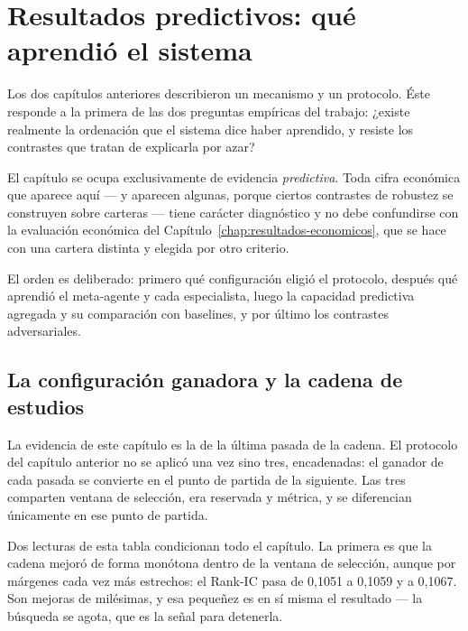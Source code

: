 \chapter{Resultados predictivos: qué aprendió el sistema}
\label{chap:resultados}

Los dos capítulos anteriores describieron un mecanismo y un protocolo. Éste responde a la primera de
las dos preguntas empíricas del trabajo: ¿existe realmente la ordenación que el sistema dice haber
aprendido, y resiste los contrastes que tratan de explicarla por azar?

El capítulo se ocupa exclusivamente de evidencia \emph{predictiva}. Toda cifra económica que aparece
aquí --- y aparecen algunas, porque ciertos contrastes de robustez se construyen sobre carteras ---
tiene carácter diagnóstico y no debe confundirse con la evaluación económica del
Capítulo~\ref{chap:resultados-economicos}, que se hace con una cartera distinta y elegida por otro
criterio.

El orden es deliberado: primero qué configuración eligió el protocolo, después qué aprendió el
meta-agente y cada especialista, luego la capacidad predictiva agregada y su comparación con
baselines, y por último los contrastes adversariales.
\section{La configuración ganadora y la cadena de estudios}
\label{sec:configuracion-ganadora}

La evidencia de este capítulo es la de la última pasada de la cadena. El protocolo del capítulo
anterior no se aplicó una vez sino tres, encadenadas: el ganador de cada pasada se convierte en el
punto de partida de la siguiente. Las tres comparten ventana de selección, era reservada y métrica,
y se diferencian únicamente en ese punto de partida.

\begin{table}[H]
  \centering
  \small
  \caption{Las tres pasadas de la cadena y su ganador.}
  \label{tab:cadena}
  {\setlength{\tabcolsep}{5.8pt}}
  \caption*{Rank-IC, IC-IR y $t$ de Newey--West son de la ventana de selección; IR y exceso
  corresponden a la cartera \emph{por defecto} de cada estudio, no a la optimizada del
  Capítulo~\ref{chap:resultados-economicos}.}
\end{table}

Dos lecturas de esta tabla condicionan todo el capítulo. La primera es que la cadena mejoró de forma
monótona dentro de la ventana de selección, aunque por márgenes cada vez más estrechos: el Rank-IC
pasa de 0,1051 a 0,1059 y a 0,1067. Son mejoras de milésimas, y esa pequeñez es en sí misma el
resultado --- la búsqueda se agota, que es la señal para detenerla.

